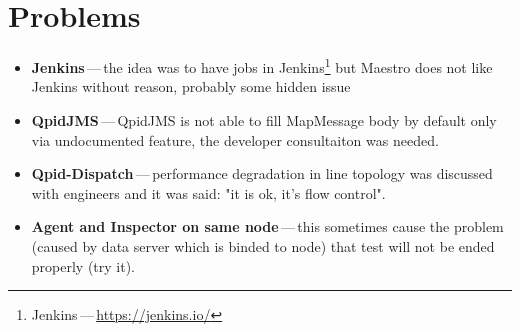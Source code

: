 \section{Problems}
\begin{itemize}
  \item \textbf{Jenkins}\,---\,the idea was to have jobs in Jenkins\footnote{Jenkins\,---\,\url{https://jenkins.io/}} but Maestro does not like Jenkins without reason, probably some hidden issue
  \item \textbf{QpidJMS}\,---\,QpidJMS is not able to fill MapMessage body by default only via undocumented feature, the developer consultaiton was needed.
  \item \textbf{Qpid-Dispatch}\,---\,performance degradation in line topology was discussed with engineers and it was said: "it is ok, it's flow control".
  \item \textbf{Agent and Inspector on same node}\,---\,this sometimes cause the problem (caused by data server which is binded to node) that test will not be ended properly (try it).
\end{itemize}
